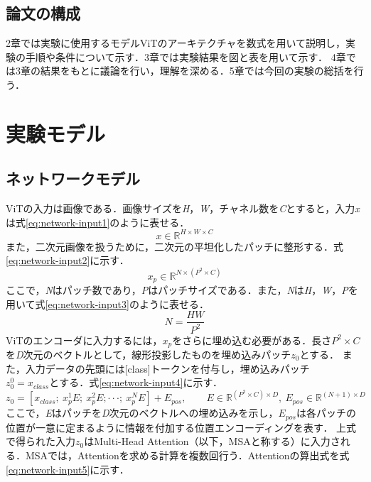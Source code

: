 \documentclass[a4paper, oneside, openany, dvipdfmx]{suribt}%
\newcommand{\eref}[1]{式\eqref{#1}}
\begin{document}
\section{論文の構成}
2章では実験に使用するモデルViTのアーキテクチャを数式を用いて説明し，実験の手順や条件について示す．3章では実験結果を図と表を用いて示す．
4章では3章の結果をもとに議論を行い，理解を深める．5章では今回の実験の総括を行う．

\chapter{実験モデル}

\section{ネットワークモデル}
ViTの入力は画像である．画像サイズを\textit{H}，\textit{W}，チャネル数を\textit{C}とすると，入力\textit{x}は\eref{eq:network-input1}のように表せる．
\begin{equation}
  x\in\mathbb{R}^{H\times W\times C}
  \label{eq:network-input1}
\end{equation}
また，二次元画像を扱うために，二次元の平坦化したパッチに整形する．\eref{eq:network-input2}に示す．
\begin{equation}
  x_{p}\in\mathbb{R}^{N\times(P^{2}\times C)}
  \label{eq:network-input2}
\end{equation}
ここで，\textit{N}はパッチ数であり，\textit{P}はパッチサイズである．また，\textit{N}は\textit{H}，\textit{W}，\textit{P}を用いて\eref{eq:network-input3}のように表せる．
\begin{equation}
  N=\frac{HW}{P^{2}}
  \label{eq:network-input3}
\end{equation}
ViTのエンコーダに入力するには，$x_{p}$をさらに埋め込む必要がある．長さ$P^{2}\times C$を\textit{D}次元のベクトルとして，線形投影したものを埋め込みパッチ$z_{0}$とする．
また，入力データの先頭には[class]トークンを付与し，埋め込みパッチ$z^{0}_{0}=x_{class}とする$．\eref{eq:network-input4}に示す．
\begin{equation}
  z_{0}=[x_{class};\ x^{1}_{p}E;\ x^{2}_{p}E;\cdot\cdot\cdot;\ x^{N}_{p}E]+E_{pos},\qquad E\in\mathbb{R}^{(P^{2}\times C)\times D},\ E_{pos}\in\mathbb{R}^{(N+1)\times D}
  \label{eq:network-input4}
\end{equation}
ここで，\textit{E}はパッチを\textit{D}次元のベクトルへの埋め込みを示し，$E_{pos}$は各パッチの位置が一意に定まるように情報を付加する位置エンコーディングを表す．
上式で得られた入力$z_{0}$はMulti-Head Attention（以下，MSAと称する）に入力される．MSAでは，Attentionを求める計算を複数回行う．Attentionの算出式を\eref{eq:network-input5}に示す．
\end{document}
